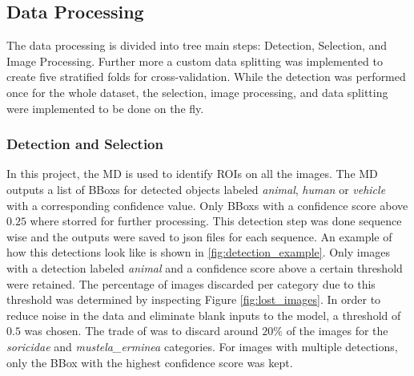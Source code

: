     \subsection{Data Processing}

    The data processing is divided into tree main steps: Detection, Selection, and Image Processing. 
    Further more a custom data splitting was implemented to create five stratified folds for cross-validation.
    While the detection was performed once for the whole dataset, the selection, image processing, and data splitting were implemented to be done on the fly.

        \subsubsection{Detection and Selection}
    
        In this project, the \ac{MD} \autocite{morrisEfficientPipelineCamera2025} is used to identify \acp{ROI} on all the images.
        The \ac{MD} outputs a list of \acp{BBox} for detected objects labeled \textit{animal}, \textit{human} or \textit{vehicle} with a corresponding confidence value.
        Only \acp{BBox} with a confidence score above \(0.25\) where storred for further processing.
        This detection step was done sequence wise and the outputs were saved to json files for each sequence.
        An example of how this detections look like is shown in \autoref{fig:detection_example}.
        Only images with a detection labeled \textit{animal} and a confidence score above a certain threshold were retained.  
        The percentage of images discarded per category due to this threshold was determined by inspecting Figure \autoref{fig:lost_images}.  
        In order to reduce noise in the data and eliminate blank inputs to the model, a threshold of \(0.5\) was chosen.
        The trade of was to discard around \(20\%\) of the images for the \textit{soricidae} and \textit{mustela\_erminea} categories.
        For images with multiple detections, only the \ac{BBox} with the highest confidence score was kept.

